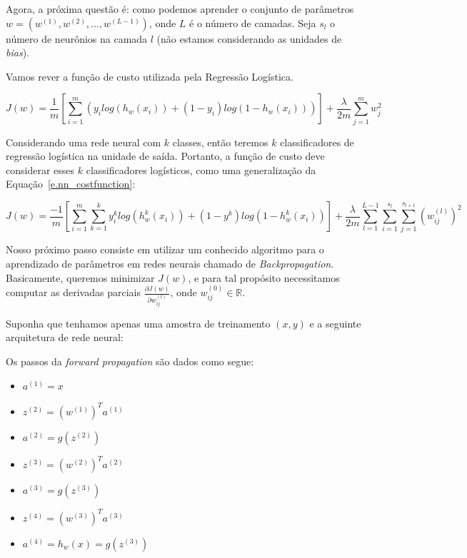 Agora, a próxima questão é: como podemos aprender o conjunto de parâmetros $w = (w^{(1)}, w^{(2)}, \dots, w^{(L-1)})$, onde $L$ é o número de camadas. Seja $s_l$ o número de neurônios na camada $l$ (não estamos considerando as unidades de \emph{bias}).

Vamos rever a função de custo utilizada pela Regressão Logística.

\begin{equation}
\label{e.nn_costfunction}
J(w) = \frac{1}{m}[\sum\limits_{i=1}^m (y_i log(h_w(x_i)) + (1 - y_i) log(1 - h_w(x_i)))] + \frac{\lambda}{2m}\sum\limits_{j=1}^m w_j^2	
\end{equation}

Considerando uma rede neural com $k$ classes, então teremos $k$ classificadores de regressão logística na unidade de saída. Portanto, a função de custo deve considerar esses $k$ classificadores logísticos, como uma generalização da Equação~\ref{e.nn_costfunction}:

\begin{equation}
J(w) = \frac{-1}{m}[\sum\limits_{i=1}^m\sum\limits_{k=1}^k y_i^k log(h_w^k(x_i))+(1-y^k)log(1-h_w^k(x_i))] + \frac{\lambda}{2m}\sum\limits_{l=1}^{L-1}\sum\limits_{i=1}^{s_l}\sum\limits_{j=1}^{s_{l+1}}(w_{ij}^{(l)})^2
\end{equation}

Nosso próximo passo consiste em utilizar um conhecido algoritmo para o aprendizado de parâmetros em redes neurais chamado de \emph{Backpropagation}. Basicamente, queremos minimizar $J(w)$, e para tal propósito necessitamos computar as derivadas parciais $\frac{\partial J(w)}{\partial w_{ij}^{(l)}}$, onde $w_{ij}^{(0)} \in \mathbb{R}$.

Suponha que tenhamos apenas uma amostra de treinamento $(x, y)$ e a seguinte arquitetura de rede neural:

Os passos da \emph{forward propagation} são dados como segue:

\begin{itemize}
\item $a^{(1)} = x$
\item $z^{(2)} = (w^{(1)})^T a^{(1)}$
\item $a^{(2)} = g(z^{(2)})$
\item $z^{(3)} = (w^{(2)})^T a^{(2)}$
\item $a^{(3)} = g(z^{(3)})$
\item $z^{(4)} = (w^{(3)})^T a^{(3)}$
\item $a^{(4)} = h_w(x) = g(z^{(3)})$	
\end{itemize}

